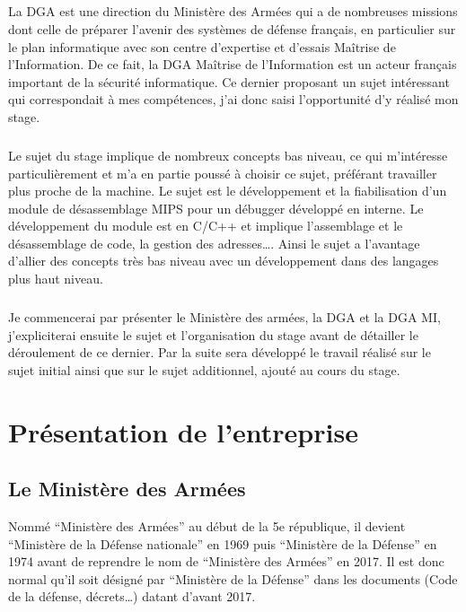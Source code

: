 \documentclass[11pt, book, english, french]{upmethodology-document}
\begin{document}
		\paragraph*{}
			La DGA est une direction du Ministère des Armées qui a de nombreuses missions dont celle de préparer l’avenir des systèmes de défense français, en particulier sur le plan informatique avec son centre d’expertise et d’essais Maîtrise de l'Information. De ce fait, la DGA Maîtrise de l'Information est un acteur français important de la sécurité informatique. Ce dernier proposant un sujet intéressant qui correspondait à mes compétences, j'ai donc saisi l'opportunité d'y réalisé mon stage.
		\paragraph*{}
			Le sujet du stage implique de nombreux concepts bas niveau, ce qui m'intéresse particulièrement et m'a en partie poussé à choisir ce sujet, préférant travailler plus proche de la machine.  Le sujet est le développement et la fiabilisation d'un module de désassemblage MIPS pour un débugger développé en interne. Le développement du module est en C/C++ et implique l'assemblage et le désassemblage de code, la gestion des adresses\ldots. Ainsi le sujet a l'avantage d'allier des concepts très bas niveau avec un développement dans des langages plus haut niveau.
		\paragraph*{}
			Je commencerai par présenter le Ministère des armées, la DGA et la DGA MI, j'expliciterai ensuite le sujet et l'organisation du stage avant de détailler le déroulement de ce dernier. Par la suite sera développé le travail réalisé sur le sujet initial ainsi que sur le sujet additionnel, ajouté au cours du stage.
	\chapter{Présentation de l'entreprise}
		\section{Le Ministère des Armées}
			\begin{upminfo}
				Nommé ``Ministère des Armées'' au début de la 5e république, il devient ``Ministère de la Défense nationale'' en 1969 puis ``Ministère de la Défense'' en 1974 avant de reprendre le nom de ``Ministère des Armées'' en 2017. Il est donc normal qu'il soit désigné par ``Ministère de la Défense'' dans les documents (Code de la défense, décrets\ldots) datant d'avant 2017.
			\end{upminfo}
\end{document}
